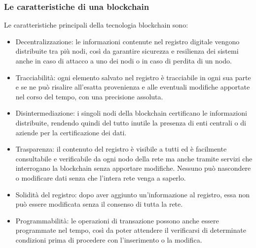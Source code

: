 \documentclass[a4paper]{article}
\begin{document}
    \subsubsection{Le caratteristiche di una blockchain}
    Le caratteristiche principali della tecnologia blockchain sono:
    \begin{itemize}
      \item Decentralizzazione: le informazioni contenute nel registro digitale vengono distribuite tra più nodi, così da garantire sicurezza e resilienza dei sistemi anche in caso di attacco a uno dei nodi o in caso di perdita di un nodo.
      \item Tracciabilità: ogni elemento salvato nel registro è tracciabile in ogni sua parte e se ne può risalire all’esatta provenienza e alle eventuali modifiche apportate nel corso del tempo, con una precisione assoluta.
      \item Disintermediazione: i singoli nodi della blockchain certificano le informazioni distribuite, rendendo quindi del tutto inutile la presenza di enti centrali o di aziende per la certificazione dei dati.
      \item Trasparenza: il contenuto del registro è visibile a tutti ed è facilmente consultabile e verificabile da ogni nodo della rete ma anche tramite servizi che interrogano la blockchain senza apportare modifiche. Nessuno può nascondere o modificare dati senza che l'intera rete venga a saperlo.
      \item Solidità del registro: dopo aver aggiunto un'informazione al registro, essa non può essere modificata senza il consenso di tutta la rete.
      \item Programmabilità: le operazioni di transazione possono anche essere programmate nel tempo, così da poter attendere il verificarsi di determinate condizioni prima di procedere con l'inserimento o la modifica\cite{blockchain1}.
    \end{itemize}
\end{document}
